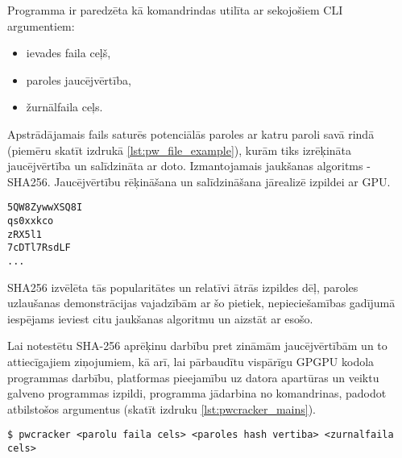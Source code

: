Programma ir paredzēta kā komandrindas utilīta ar sekojošiem CLI argumentiem:
\begin{itemize}
    \item ievades faila ceļš,
    \item paroles jaucējvērtība,
    \item žurnālfaila ceļs.
\end{itemize}

Apstrādājamais fails saturēs potenciālās paroles ar katru paroli savā rindā
(piemēru skatīt izdrukā \ref{lst:pw_file_example}), kurām tiks izrēķināta
jaucējvērtība un salīdzināta ar doto. Izmantojamais jaukšanas algoritms -
SHA256. Jaucējvērtību rēķināšana un salīdzināšana jārealizē izpildei ar GPU.
\cite{kursa-darbs}

\begin{lstlisting}[caption={Paroļu ieejas faila piemērs ar nejauši ģenerētām
    parolēm}, captionpos=b, label=lst:pw_file_example]
5QW8ZywwXSQ8I
qs0xxkco
zRX5l1
7cDTl7RsdLF
...
\end{lstlisting}

SHA256 izvēlēta tās popularitātes un relatīvi ātrās izpildes dēļ,
paroles uzlaušanas demonstrācijas vajadzībām ar šo pietiek, nepieciešamības
gadījumā iespējams ieviest citu jaukšanas algoritmu un aizstāt ar esošo.

Lai notestētu SHA-256 aprēķinu darbību pret zināmām jaucējvērtībām un to
attiecīgajiem ziņojumiem, kā arī, lai pārbaudītu vispārīgu GPGPU kodola
programmas darbību, platformas pieejamību uz datora apartūras un veiktu
galveno programmas izpildi, programma jādarbina no komandrinas, padodot
atbilstošos argumentus (skatīt izdruku  \ref{lst:pwcracker_mains}). \cite{kursa-darbs}

\begin{lstlisting}[caption={Programmas galvenā izpilde}, captionpos=b, 
    label=lst:pwcracker_mains]
$ pwcracker <parolu faila cels> <paroles hash vertiba> <zurnalfaila cels>
\end{lstlisting}

